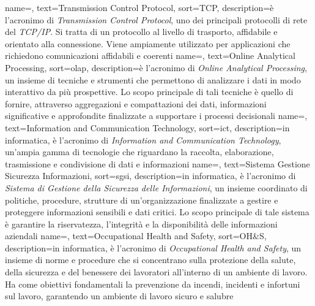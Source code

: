  {
    name=,
    text=Transmission Control Protocol,
    sort=TCP,
    description={è l'acronimo di \textit{Transmission Control Protocol}, uno dei principali protocolli di rete del \textit{TCP/IP}. Si tratta di un 
    protocollo al livello di trasporto, affidabile e orientato alla connessione. Viene ampiamente utilizzato per applicazioni 
    che richiedono comunicazioni affidabili e coerenti}
}
 {
    name=,
    text=Online Analytical Processing,
    sort=olap,
    description={è l'acronimo di \textit{Online Analytical Processing}, un insieme di tecniche e strumenti che permettono di analizzare i dati in modo 
    interattivo da più prospettive. Lo scopo principale di tali tecniche è quello di fornire, attraverso aggregazioni e compattazioni dei dati, informazioni 
    significative e approfondite finalizzate a supportare i processi decisionali
    }
}
 {
    name=,
    text=Information and Communication Technology,
    sort=ict,
    description={in informatica, è l'acronimo di \textit{Information and Communication Technology}, un'ampia gamma di tecnologie che riguardano la raccolta, 
    elaborazione, trasmissione e condivisione di dati e informazioni}
}
 {
    name=,
    text=Sistema Gestione Sicurezza Informazioni,
    sort=sgsi,
    description={in informatica, è l'acronimo di \textit{Sistema di Gestione della Sicurezza delle Informazioni}, un insieme coordinato di politiche, procedure, strutture di un'organizzazione finalizzate a 
    gestire e proteggere informazioni sensibili e dati critici. Lo scopo principale di tale sistema è garantire la riservatezza, l'integrità 
    e la disponibilità delle informazioni aziendali}
}
 {
    name=,
    text=Occupational Health and Safety,
    sort=OH\&S,
    description={in informatica, è l'acronimo di \textit{Occupational Health and Safety}, un insieme di norme e procedure che si concentrano 
    sulla protezione della salute, della sicurezza e del benessere dei lavoratori all'interno di un ambiente di lavoro. Ha come obiettivi 
    fondamentali la prevenzione da incendi, incidenti e infortuni sul lavoro, garantendo un ambiente di lavoro sicuro e salubre}
}

